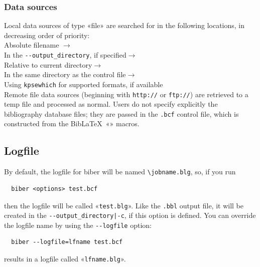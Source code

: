 \documentclass{ltxdockit}
\begin{document}
\subsubsection{Data sources}

Local data sources of type «file» are searched for in the following
locations, in decreasing order of priority:\\[2ex]

\noindent Absolute filename $\rightarrow$\\
\hspace*{1em}In the \verb+--output_directory+, if specified$\rightarrow$\\
\hspace*{2em}Relative to current directory$\rightarrow$\\
\hspace*{3em}In the same directory as the control file$\rightarrow$\\
\hspace*{4em}Using \verb+kpsewhich+ for supported formats, if available\\[2ex]

\noindent Remote file data sources (beginning with \verb+http://+ or
\verb+ftp://+) are retrieved to a temp file and processed as normal. Users
do not specify explicitly the bibliography database files; they are passed
in the \verb+.bcf+ control file, which is constructed from the
Bib\LaTeX\ «\verb++» macros.

\subsection{Logfile}

By default, the logfile for biber will be named \verb+\jobname.blg+,
so, if you run

\begin{verbatim}
  biber <options> test.bcf
\end{verbatim}

\noindent then the logfile will be called «\verb+test.blg+». Like the
\verb+.bbl+ output file, it will be created in the
\verb+--output_directory|-c+, if this option is defined. You can
override the logfile name by using the \verb+--logfile+ option:

\begin{verbatim}
  biber --logfile=lfname test.bcf
\end{verbatim}

\noindent results in a logfile called «\verb+lfname.blg+».\\
\end{document}
